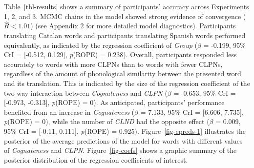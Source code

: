 \documentclass[
]{article}
\begin{document}
Table~\ref{tbl-results} shows a summary of participants' accuracy across
Experiments 1, 2, and 3. MCMC chains in the model showed strong evidence
of convergence (\(\hat{R}<1.01\)) (see Appendix 2 for more detailed
model diagnostics). Participants translating Catalan words and
participants translating Spanish words performed equivalently, as
indicated by the regression coefficient of \emph{Group} (\(\beta\) =
-0.199, 95\% CrI = {[}-0.512, 0.129{]}, \emph{p}(ROPE) = 0.238).
Overall, participants responded less accurately to words with more CLPNs
than to words with fewer CLPNs, regardless of the amount of phonological
similarity between the presented word and its translation. This is
indicated by the size of the regression coefficient of the two-way
interaction between \emph{Cognateness} and \emph{CLPN} (\(\beta\) =
-0.653, 95\% CrI = {[}-0.973, -0.313{]}, \emph{p}(ROPE) = 0). As
anticipated, participants' performance benefited from an increase in
\emph{Cognateness} (\(\beta\) = 7.133, 95\% CrI = {[}6.606, 7.735{]},
\emph{p}(ROPE) = 0), while the number of \emph{CLND} had the opposite
effect (\(\beta\) = 0.009, 95\% CrI = {[}-0.11, 0.111{]}, \emph{p}(ROPE)
= 0.925). Figure~\ref{fig-epreds-1} illustrates the posterior of the
average predictions of the model for words with different values of
\emph{Cognateness} and \emph{CLPN}. Figure~\ref{fig-coefs} shows a
graphic summary of the posterior distribution of the regression
coefficients of interest.

\captionsetup{labelsep=none}
\end{document}
